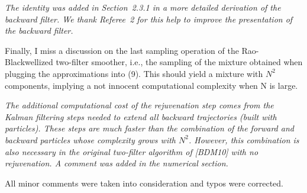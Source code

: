 \vspace{.2cm}
{\em
\noindent The identity was added in Section~2.3.1 in a more detailed derivation of the backward filter. We thank Referee~2 for this help to improve the presentation of the backward filter.
}

\vspace{.5cm}

\noindent Finally, I miss a discussion on the last sampling operation of the Rao-Blackwellized
two-filter smoother, i.e., the sampling of the mixture obtained when plugging the approximations into (9). This should yield a mixture with $N^2$ components, implying a not innocent computational complexity when N is large.

\vspace{.2cm}
{\em
\noindent The additional computational cost of the rejuvenation step comes from the Kalman filtering steps needed to extend all backward trajectories (built with particles). These steps are much faster than the combination of the forward and backward particles whose complexity grows with $N^2$. However, this combination is also necessary in the original two-filter algorithm of [BDM10] with no rejuvenation. A comment was added in the numerical section.
}

\vspace{.5cm}

\noindent All minor comments were taken into consideration and typos were corrected.
